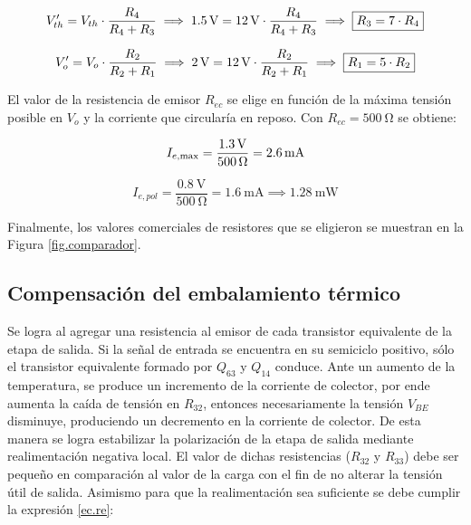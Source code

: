\begin{equation}
	\centering
	V_{th}' = V_{th} \cdot \frac{R_4}{R_4 + R_3} \implies \SI{1.5}{\volt} = \SI{12}{\volt} \cdot \frac{R_4}{R_4 + R_3} \implies \boxed{R_3 = 7 \cdot R_4}
\end{equation}

\begin{equation}
	\centering
	V_o' = V_o \cdot \frac{R_2}{R_2 + R_1} \implies \SI{2}{\volt} = \SI{12}{\volt} \cdot \frac{R_2}{R_2 + R_1} \implies \boxed{R_1 = 5 \cdot R_2}
	\end{equation}

	El valor de la resistencia de emisor $R_{ec}$ se elige en función de la máxima tensión posible en $V_o$ y la corriente que circularía en reposo. Con $R_{ec} = \SI{500}{\ohm}$ se obtiene:

	\begin{equation}
		\centering
		I_{e,\max} = \frac{ \SI{1.3}{\volt} }{ \SI{500}{\ohm} } = \SI{2.6}{\milli\ampere}
	\end{equation}

	\begin{equation}
		I_{e,pol} = \frac{ \SI{0.8}{\volt} }{ \SI{500}{\ohm} } = \SI{1.6}{\milli\ampere} \implies \SI{1.28}{\milli\watt}
	\end{equation}

Finalmente, los valores comerciales de resistores que se eligieron se muestran en la Figura \ref{fig.comparador}.	
	
\subsection{Compensación del embalamiento térmico}

	Se logra al agregar una resistencia al emisor de cada transistor equivalente de la etapa de salida. Si la señal de entrada se encuentra en su semiciclo positivo, sólo el transistor equivalente formado por $Q_{63}$ y $Q_{14}$ conduce. Ante un aumento de la temperatura, se produce un incremento de la corriente de colector, por ende aumenta la caída de tensión en $R_{32}$, entonces necesariamente la tensión $V_{BE}$ disminuye, produciendo un decremento en la corriente de colector. De esta manera se logra estabilizar la polarización de la etapa de salida mediante realimentación negativa local. El valor de dichas resistencias ($R_{32}$ y $R_{33}$) debe ser pequeño en comparación al valor de la carga con el fin de no alterar la tensión útil de salida. Asimismo para que la realimentación sea suficiente se debe cumplir la expresión \eqref{ec.re}:

